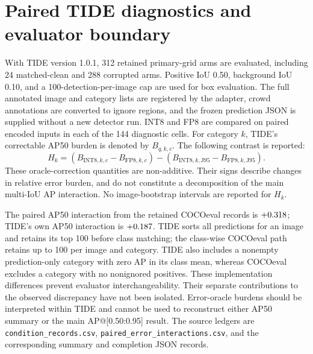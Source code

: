 \documentclass[10pt]{article}
\newcommand{\Jclean}{\mathrm{J95}}
\begin{document}
\FloatBarrier

\section{Paired TIDE diagnostics and evaluator boundary}

With TIDE version 1.0.1, 312 retained primary-grid arms are evaluated, including 24 matched-clean and 288 corrupted arms. Positive IoU 0.50, background IoU 0.10, and a 100-detection-per-image cap are used for box evaluation. The full annotated image and category lists are registered by the adapter, crowd annotations are converted to ignore regions, and the frozen prediction JSON is supplied without a new detector run. INT8 and FP8 are compared on paired encoded inputs in each of the 144 diagnostic cells. For category $k$, TIDE's correctable AP50 burden is denoted by $B_{q,k,c}$. The following contrast is reported:
\[
H_k=(B_{\mathrm{INT8},k,c}-B_{\mathrm{FP8},k,c})
 -(B_{\mathrm{INT8},k,\Jclean}-B_{\mathrm{FP8},k,\Jclean}).
\]
These oracle-correction quantities are non-additive. Their signs describe changes in relative error burden, and do not constitute a decomposition of the main multi-IoU AP interaction. No image-bootstrap intervals are reported for $H_k$.

\begin{table}[htbp]
\centering\small
\caption{Equal-cell mean paired TIDE burden interactions in AP50 points. Each dataset contributes 36 cells; all contributes 144. Cls: classification; Loc: localization; Both: their joint error category; Dupe: duplicates; Bkg: background.}
\label{tab:tide-burdens}

\end{table}

The paired AP50 interaction from the retained COCOeval records is $+0.318$; TIDE's own AP50 interaction is $+0.187$. TIDE sorts all predictions for an image and retains its top 100 before class matching; the class-wise COCOeval path retains up to 100 per image and category. TIDE also includes a nonempty prediction-only category with zero AP in its class mean, whereas COCOeval excludes a category with no nonignored positives. These implementation differences prevent evaluator interchangeability. Their separate contributions to the observed discrepancy have not been isolated. Error-oracle burdens should be interpreted within TIDE and cannot be used to reconstruct either AP50 summary or the main AP@[0.50:0.95] result. The source ledgers are \texttt{condition\_records.csv}, \texttt{paired\_error\_interactions.csv}, and the corresponding summary and completion JSON records.
\end{document}
